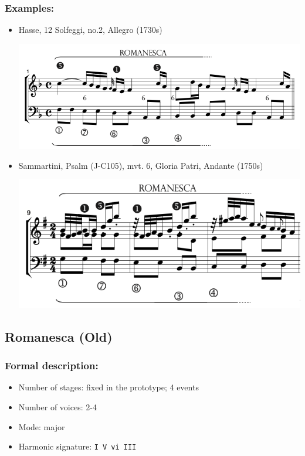 \documentclass[11pt, openany]{article}
\begin{document}
\subsubsection{Examples:}
\begin{itemize}
\item Hasse, 12 Solfeggi, no.2, Allegro (1730s)
\begin{center}
\includegraphics[scale=0.5]{hassesolfeggi.png}
\end{center}
\item Sammartini, Psalm (J-C105), mvt. 6, Gloria Patri, Andante (1750s)
\begin{center}
\includegraphics[scale=0.5]{sammartini105.png}
\end{center}
\end{itemize}


	\subsection{Romanesca (Old)}
	
\subsubsection{Formal description:}
\begin{itemize}
\item Number of stages: fixed in the prototype; 4 events
\item Number of voices: 2-4
\item Mode: major
\item Harmonic signature: \texttt{I V vi III}
\end{itemize}
\end{document}
